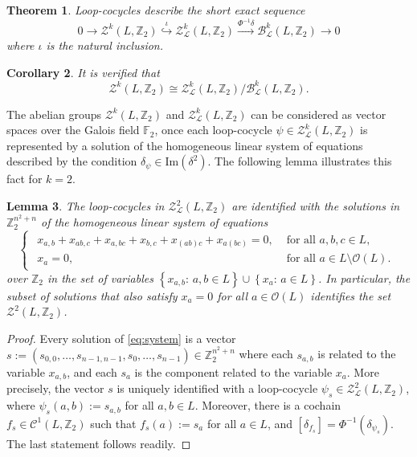 \documentclass[11pt,a4paper]{article}
\newtheorem{theorem}{Theorem}[section]
\newtheorem{lemma}[theorem]{Lemma}
\newtheorem{corollary}[theorem]{Corollary}
\begin{document}
\begin{theorem}\label{theorem_family_cochains} Loop-cocycles describe the short exact sequence
\begin{equation}\label{eq:sequence}
0\rightarrow \mathcal{Z}^k(L,\mathbb{Z}_2)\overset{\iota}{\hookrightarrow} \mathcal{Z}^k_\mathcal{L}(L,\mathbb{Z}_2) \xrightarrow{\Phi^{-1}\delta} \mathcal{B}_\mathcal{L}^k(L,\mathbb{Z}_2)\rightarrow  0
\end{equation}
where $\iota$ is the natural inclusion.
\end{theorem}

\begin{corollary}\label{corollary_family_cochains_0} It is verified that
\[\mathcal{Z}^k(L,\mathbb{Z}_2)\cong\mathcal{Z}_{\mathcal{L}}^k(L,\mathbb{Z}_2)/\mathcal{B}_{\mathcal{L}}^k(L,\mathbb{Z}_2).\]
\end{corollary}

The abelian groups $\mathcal{Z}^k(L,\mathbb{Z}_2)$ and $\mathcal{Z}_{\mathcal{L}}^k(L,\mathbb{Z}_2)$ can be considered as vector spaces over the Galois field $\mathbb{F}_2$, once each loop-cocycle $\psi\in\mathcal{Z}_{\mathcal{L}}^k(L,\mathbb{Z}_2)$ is represented by a solution of the homogeneous linear system of equations described by the condition $\delta_\psi\in \mathrm{Im}(\delta^2)$. The following lemma illustrates this fact for $k=2$.

\begin{lemma}\label{lemma_zeros} The loop-cocycles in $\mathcal{Z}_{\mathcal{L}}^2(L,\mathbb{Z}_2)$ are identified with the solutions in $\mathbb{Z}_2^{n^2+n}$ of the homogeneous linear system of equations
\begin{equation}\label{eq:system}
\begin{cases}
\begin{array}{rl}x_{a,b}+x_{ab,c}+x_{a,bc}+x_{b,c}+x_{(ab)c}+x_{a(bc)}=0, & \text{ for all }
a,b,c\in L,\\
x_a=0, & \text{ for all } a\in L\setminus\mathcal{O}(L).
\end{array}
\end{cases}
\end{equation}
over $\mathbb{Z}_2$ in the set of variables $\left\{x_{a,b}\colon\, a,b\in L\right\}\cup \left\{x_a\colon\,  a\in L\right\}$. In particular, the subset of solutions that also satisfy $x_a=0$ for all $a\in \mathcal{O}(L)$ identifies the set $\mathcal{Z}^2(L,\mathbb{Z}_2)$.
\end{lemma}

\begin{proof} Every solution of \eqref{eq:system} is a vector $s:=\left(s_{0,0},\ldots,s_{n-1,n-1},s_0,\ldots,s_{n-1}\right)\in \mathbb{Z}_2^{n^2+n}$ where each $s_{a,b}$ is related to the variable $x_{a,b}$, and each $s_a$ is the component related to the variable $x_a$. More precisely, the vector $s$ is uniquely identified with a loop-cocycle $\psi_s\in\mathcal{Z}_\mathcal{L}^2(L,\mathbb{Z}_2)$, where $\psi_s(a,b):=s_{a,b}$ for all $a,b\in L$. Moreover, there is a cochain $f_s\in\mathcal{C}^1(L,\mathbb{Z}_2)$ such that $f_s(a):=s_a$ for all $a\in L$, and $[\delta_{f_s}]=\Phi^{-1}(\delta_{\psi_s})$. The last statement follows readily.
\end{proof}
\end{document}
